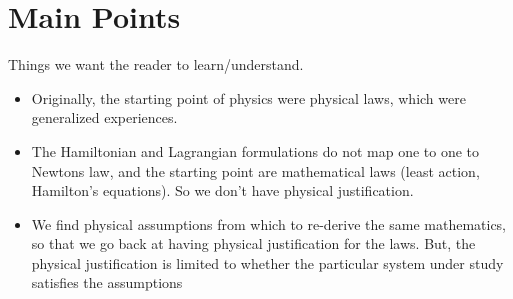 \documentclass{article}
\begin{document}
\section{Main Points}
Things we want the reader to learn/understand.


\begin{itemize}
\item Originally, the starting point of physics were physical laws, which were generalized experiences.

\item The Hamiltonian and Lagrangian formulations do not map one to one to Newtons law, and the starting point are mathematical laws (least action, Hamilton's equations). So we don't have physical justification.

\item We find physical assumptions from which to re-derive the same mathematics, so that we go back at having physical justification for the laws. But, the physical justification is limited to whether the particular system under study satisfies the assumptions


\end{itemize}
\end{document}
